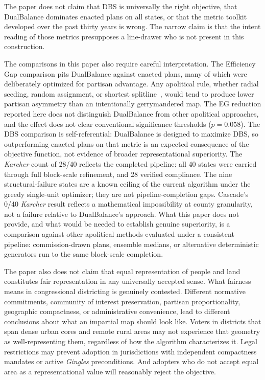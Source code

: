 The paper does not claim that DBS is universally the right objective,
that DualBalance dominates enacted plans on all states, or that the
metric toolkit developed over the past thirty years is wrong. The
narrow claim is that the intent reading of those metrics presupposes
a line-drawer who is not present in this construction.

The comparisons in this paper also require careful interpretation.
The Efficiency Gap comparison pits DualBalance against enacted plans,
many of which were deliberately optimized for partisan advantage.
Any apolitical rule, whether radial seeding, random assignment, or
shortest splitline~\cite{smithsplit}, would tend to produce lower partisan asymmetry
than an intentionally gerrymandered map. The EG reduction reported
here does not distinguish DualBalance from other apolitical
approaches, and the effect does not clear conventional significance
thresholds ($p = 0.058$). The DBS comparison is self-referential:
DualBalance is designed to maximize DBS, so outperforming enacted
plans on that metric is an expected consequence of the objective
function, not evidence of broader representational superiority.
The \textit{Karcher} count of 28/40 reflects the completed pipeline:
all 40 states were carried through full block-scale refinement, and
28 verified compliance. The nine structural-failure states are a
known ceiling of the current algorithm under the greedy single-unit
optimizer; they are not pipeline-completion gaps. Cascade's 0/40
\textit{Karcher} result reflects a mathematical impossibility at
county granularity, not a failure relative to DualBalance's
approach. What this paper does not provide, and what would be
needed to establish genuine superiority, is a comparison against
other apolitical methods evaluated under a consistent pipeline:
commission-drawn plans, ensemble medians, or alternative
deterministic generators run to the same block-scale completion.

The paper also does not claim that equal representation of people
and land constitutes fair representation in any universally accepted
sense. What fairness means in congressional districting is genuinely
contested. Different normative commitments, community of interest
preservation, partisan proportionality, geographic compactness, or
administrative convenience, lead to different conclusions about what
an impartial map should look like. Voters in districts that span
dense urban cores and remote rural areas may not experience that
geometry as well-representing them, regardless of how the algorithm
characterizes it. Legal restrictions may prevent adoption in
jurisdictions with independent compactness mandates or active
\textit{Gingles} preconditions. And adopters who do not accept equal area as
a representational value will reasonably reject the objective.

